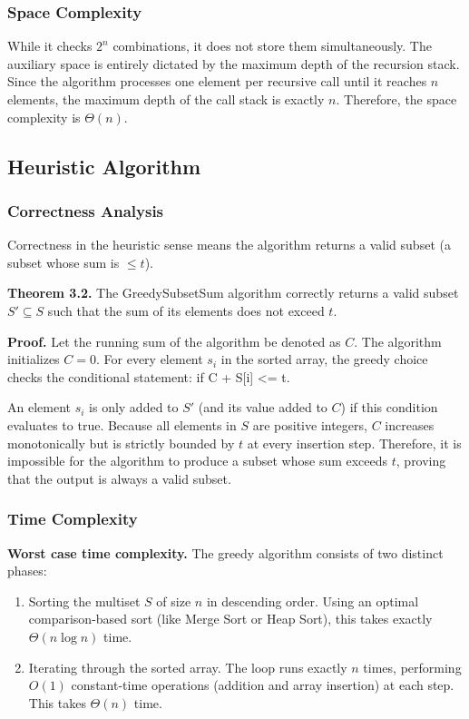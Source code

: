 \documentclass[12pt,a4paper]{article}
\begin{document}
\subsubsection{Space Complexity}
While it checks $2^n$ combinations, it does not store them simultaneously. The auxiliary space is entirely dictated by the maximum depth of the recursion stack. Since the algorithm processes one element per recursive call until it reaches $n$ elements, the maximum depth of the call stack is exactly $n$. Therefore, the space complexity is $\Theta(n)$.

\subsection{Heuristic Algorithm}

\subsubsection{Correctness Analysis}
Correctness in the heuristic sense means the algorithm returns a valid subset (a subset whose sum is $\leq t$).

\textbf{Theorem 3.2.} The GreedySubsetSum algorithm correctly returns a valid subset $S' \subseteq S$ such that the sum of its elements does not exceed $t$.

\textbf{Proof.} Let the running sum of the algorithm be denoted as $C$. The algorithm initializes $C = 0$. For every element $s_i$ in the sorted array, the greedy choice checks the conditional statement: if C + S[i] <= t.

An element $s_i$ is only added to $S'$ (and its value added to $C$) if this condition evaluates to true. Because all elements in $S$ are positive integers, $C$ increases monotonically but is strictly bounded by $t$ at every insertion step. Therefore, it is impossible for the algorithm to produce a subset whose sum exceeds $t$, proving that the output is always a valid subset.

\subsubsection{Time Complexity}
\textbf{Worst case time complexity.} The greedy algorithm consists of two distinct phases:

\begin{enumerate}
\item Sorting the multiset $S$ of size $n$ in descending order. Using an optimal comparison-based sort (like Merge Sort or Heap Sort), this takes exactly $\Theta(n \log n)$ time.
\item Iterating through the sorted array. The loop runs exactly $n$ times, performing $O(1)$ constant-time operations (addition and array insertion) at each step. This takes $\Theta(n)$ time.
\end{enumerate}
\end{document}
